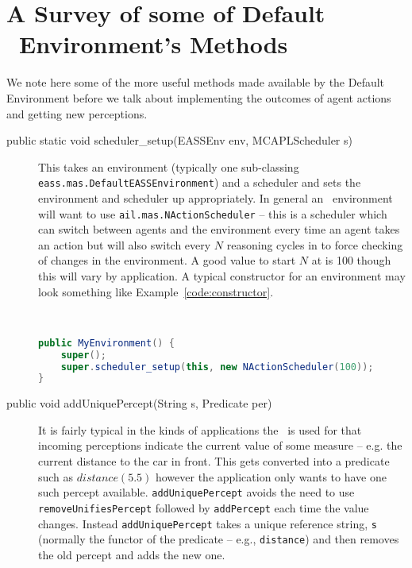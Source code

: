 \section{A Survey of some of Default \eass\ Environment's Methods}
We note here some of the more useful methods made available by the Default Environment before we talk about implementing the outcomes of agent actions and getting new perceptions.

\begin{sloppypar}
\begin{description}
\item[public static void scheduler\_setup(EASSEnv env, MCAPLScheduler s)] This takes an environment (typically one sub-classing \texttt{eass.mas.DefaultEASSEnvironment}) and a scheduler and sets the environment and scheduler up appropriately.  In general an \eass\ environment will want to use \texttt{ail.mas.NActionScheduler} -- this is a scheduler which can switch between agents and the environment every time an agent takes an action but will also switch every $N$ reasoning cycles in to force checking of changes in the environment.  A good value to start $N$ at is 100 though this will vary by application.  A typical constructor for an environment may look something like Example~\ref{code:constructor}.
\begin{ourexample}
\label{code:constructor} \quad \\
\begin{lstlisting}[basicstyle=\sffamily,language=Java,style=easslisting]
public MyEnvironment() {
	super();
	super.scheduler_setup(this, new NActionScheduler(100));
}
\end{lstlisting}
\end{ourexample}
\item[public void addUniquePercept(String s, Predicate per)] It is fairly typical in the kinds of applications the \eass\ is used for that incoming perceptions indicate the current value of some measure -- e.g. the current distance to the car in front.  This gets converted into a predicate such as $distance(5.5)$ however the application only wants to have one such percept available.  \texttt{addUniquePercept} avoids the need to use \texttt{removeUnifiesPercept} followed by \texttt{addPercept} each time the value changes.  Instead \texttt{addUniquePercept} takes a unique reference string, \texttt{s} (normally the functor of the predicate -- e.g., \texttt{distance}) and then removes the old percept and adds the new one. 

\end{description}
\end{sloppypar}
